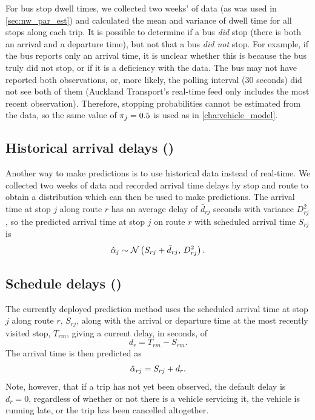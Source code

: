 For bus stop dwell times, we collected two weeks' of data (as was used in \cref{sec:nw_par_est}) and calculated the mean and variance of dwell time for all stops along each trip. It is possible to determine if a bus \emph{did} stop (there is both an arrival and a departure time), but not that a bus \emph{did not} stop. For example, if the bus reports only an arrival time, it is unclear whether this is because the bus truly did not stop, or if it is a deficiency with the data. The bus may not have reported both observations, or, more likely, the polling interval (30 seconds) did not see both of them (Auckland Transport's real-time feed only includes the most recent observation). Therefore, stopping probabilities cannot be estimated from the data, so the same value of $\pi_j=0.5$ is used as in \cref{cha:vehicle_model}.





\subsection{Historical arrival delays (\Fhist{})}
\label{eq:prediction_arrival_historical}

Another way to make predictions is to use historical data instead of real-time. We collected two weeks of data and recorded arrival time delays by stop and route to obtain a distribution which can then be used to make predictions. The arrival time at stop $j$ along route $r$ has an average delay of $\bar d_{rj}$ seconds with variance $D_{rj}^2$, so the predicted arrival time at stop $j$ on route $r$ with scheduled arrival time $S_{rj}$ is
\begin{equation}
\label{eq:arrival_pred_historical}
\hat{\alpha}_{j} \sim \mathcal{N}\left(S_{rj} + \bar d_{rj},\, D_{rj}^2\right).
\end{equation}


\subsection{Schedule delays (\Fsched{})}
\label{eq:prediction_arrival_sched_delay}

The currently deployed prediction method uses the scheduled arrival time at stop $j$ along route $r$, $S_{rj}$, along with the arrival or departure time at the most recently visited stop, $T_{rm}$, giving a current delay, in seconds, of
\begin{equation}
\label{eq:sched_cur_delay}
d_{r} = T_{rm} - S_{rm}.
\end{equation}
The arrival time is then predicted as
\begin{equation}
\label{eq:sched_pred_arr}
\hat{\alpha}_{rj} = S_{rj} + d_r.
\end{equation}
Note, however, that if a trip has not yet been observed, the default delay is $d_r = 0$, regardless of whether or not there is a vehicle servicing it, the vehicle is running late, or the trip has been cancelled altogether.
